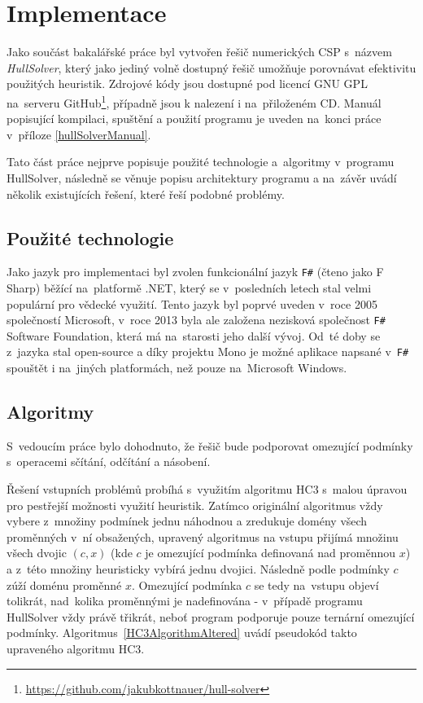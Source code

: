 



\chapter{Implementace}
Jako součást bakalářské práce byl vytvořen řešič numerických CSP s~názvem \emph{HullSolver}, který jako jediný volně dostupný řešič umožňuje porovnávat efektivitu použitých heuristik. Zdrojové kódy jsou dostupné pod licencí GNU GPL na~serveru GitHub\footnote{\url{https://github.com/jakubkottnauer/hull-solver}}, případně jsou k nalezení i na~přiloženém CD. Manuál popisující kompilaci, spuštění a použití programu je uveden na~konci práce v~příloze \ref{hullSolverManual}.

Tato část práce nejprve popisuje použité technologie a~algoritmy v~programu HullSolver, následně se věnuje popisu architektury programu a na~závěr uvádí několik existujících řešení, které řeší podobné problémy.


\section{Použité technologie}
Jako jazyk pro implementaci byl zvolen funkcionální jazyk \texttt{F\#} (čteno jako F Sharp) běžící na~platformě .NET, který se v~posledních letech stal velmi populární pro vědecké využití. Tento jazyk byl poprvé uveden v~roce 2005 společností Microsoft, v~roce 2013 byla ale založena nezisková společnost \texttt{F\#} Software Foundation, která má na~starosti jeho další vývoj. Od~té doby se z~jazyka stal open-source a díky projektu Mono je možné aplikace napsané v~\texttt{F\#} spouštět i na~jiných platformách, než pouze na~Microsoft Windows.

\section{Algoritmy}
\label{ch:algorithms}
S~vedoucím práce bylo dohodnuto, že řešič bude podporovat omezující podmínky s~operacemi sčítání, odčítání a násobení.

Řešení vstupních problémů probíhá s~využitím algoritmu HC3 s~malou úpravou pro pestřejší možnosti využití heuristik. Zatímco originální algoritmus vždy vybere z~množiny podmínek jednu náhodnou a zredukuje domény všech proměnných v~ní obsažených, upravený algoritmus na vstupu přijímá množinu všech dvojic $(c, x)$ (kde $c$ je omezující podmínka definovaná nad proměnnou $x$) a z~této množiny heuristicky vybírá jednu dvojici. Následně podle podmínky $c$ zúží doménu proměnné $x$. Omezující podmínka $c$ se tedy na~vstupu objeví tolikrát, nad~kolika proměnnými je nadefinována - v~případě programu HullSolver vždy právě třikrát, neboť program podporuje pouze ternární omezující podmínky. Algoritmus~\ref{HC3AlgorithmAltered} uvádí pseudokód takto upraveného algoritmu HC3.

